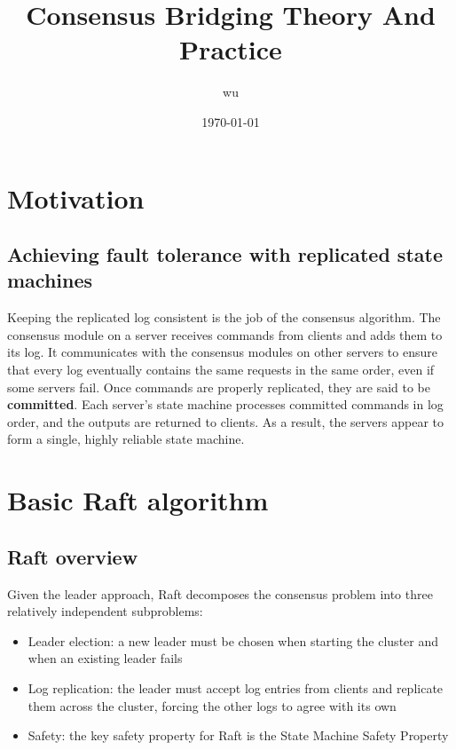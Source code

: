 \documentclass[11pt]{article}
\author{wu}
\date{\today}
\title{Consensus Bridging Theory And Practice}
\begin{document}
\maketitle
\section{Motivation}
\label{sec:org570b2f8}

\subsection{Achieving fault tolerance with replicated state machines}
\label{sec:org2c7ab8b}
Keeping the replicated log consistent is the job of the consensus algorithm. The consensus module on a
server receives commands from clients and adds them to its log. It communicates with the consensus
modules on other servers to ensure that every log eventually contains the same requests in the same
order, even if some servers fail. Once commands are properly replicated, they are said to be
\textbf{committed}. Each server’s state machine processes committed commands in log order, and the outputs are
returned to clients. As a result, the servers appear to form a single, highly reliable state machine.
\section{Basic Raft algorithm}
\label{sec:orgfb90bed}
\subsection{Raft overview}
\label{sec:orge619e35}
Given the leader approach, Raft decomposes the consensus problem into three relatively independent
subproblems:
\begin{itemize}
\item Leader election: a new leader must be chosen when starting the cluster and when an existing leader fails
\item Log replication: the leader must accept log entries from clients and replicate them across the cluster, forcing the other logs to agree with its own
\item Safety: the key safety property for Raft is the State Machine Safety Property
\end{itemize}
\end{document}
